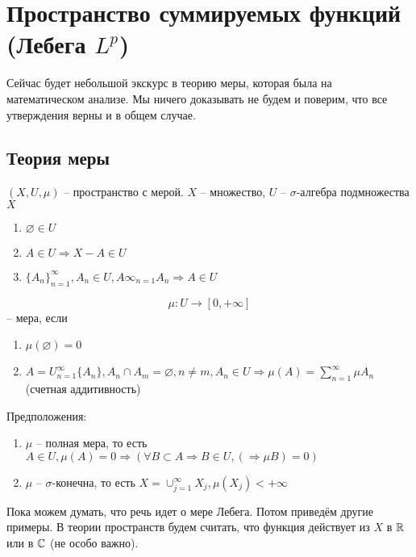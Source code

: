 \documentclass[document]{subfiles}
\begin{document}
\chapter{Пространство суммируемых функций (Лебега $L^p$)}
Сейчас будет небольшой экскурс в теорию меры, которая была на математическом анализе. Мы ничего доказывать не будем и поверим, что все утверждения верны и в общем случае.
\section{Теория меры}
\begin{definition}[Мера]
    $(X, U, \mu)$ -- пространство с мерой. $X$ -- множество, $U$ -- $\sigma$-алгебра подмножества $X$
    \begin{enumerate}
        \item $\varnothing \in U$
        \item $A \in U \Rightarrow X - A \in U$
        \item $\{ A_n\}^\infty_{n=1}, A_n \in U, A\infty_{n=1} A_n \Rightarrow A \in U$
    \end{enumerate}
    \[ \mu : U \rightarrow [0, +\infty] \] -- мера, если
    \begin{enumerate}
        \item $\mu(\varnothing) = 0$
        \item $ A = U^\infty_{n=1} \{A_n\}, A_n \cap A_m = \varnothing, n \ne m, A_n \in U \Rightarrow \mu(A) = \sum^\infty_{n=1} \mu A_n$ (счетная аддитивность)
    \end{enumerate}
\end{definition}

Предположения: 
\begin{enumerate}
    \item $\mu$ -- полная мера, то есть $A \in U, \mu(A) = 0 \Rightarrow (\forall B \subset A \Rightarrow B \in U, (\Rightarrow \mu B) =0)$
    \item $\mu$ -- $\sigma$-конечна, то есть $X = \cup^\infty_{j=1} X_j, \mu(X_j) < + \infty$
\end{enumerate}
Пока можем думать, что речь идет о мере Лебега. Потом приведём другие примеры.
В теории пространств будем считать, что функция действует из $X$ в $\mathbb{R}$ или в $\mathbb{C}$ (не особо важно).
\end{document}
